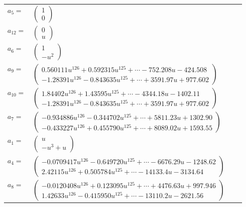 \documentclass[1p]{elsarticle_modified}
\theoremstyle{definition}
\begin{document}
\begin{tabular}{m{7pt} m{180pt} m{7pt} m{180pt} }
\flushright $a_{5}=$&$\begin{pmatrix}1\\0\end{pmatrix}$ \\
\flushright $a_{12}=$&$\begin{pmatrix}0\\u\end{pmatrix}$ \\
\flushright $a_{6}=$&$\begin{pmatrix}1\\- u^2\end{pmatrix}$ \\
\flushright $a_{9}=$&$\begin{pmatrix}0.560111 u^{126}+0.592315 u^{125}+\cdots-752.208 u-424.508\\-1.28391 u^{126}-0.843635 u^{125}+\cdots+3591.97 u+977.602\end{pmatrix}$ \\
\flushright $a_{10}=$&$\begin{pmatrix}1.84402 u^{126}+1.43595 u^{125}+\cdots-4344.18 u-1402.11\\-1.28391 u^{126}-0.843635 u^{125}+\cdots+3591.97 u+977.602\end{pmatrix}$ \\
\flushright $a_{7}=$&$\begin{pmatrix}-0.934886 u^{126}-0.344702 u^{125}+\cdots+5811.23 u+1302.90\\-0.433227 u^{126}+0.455790 u^{125}+\cdots+8089.02 u+1593.55\end{pmatrix}$ \\
\flushright $a_{1}=$&$\begin{pmatrix}u\\- u^3+u\end{pmatrix}$ \\
\flushright $a_{4}=$&$\begin{pmatrix}-0.0709417 u^{126}-0.649720 u^{125}+\cdots-6676.29 u-1248.62\\2.42115 u^{126}+0.505784 u^{125}+\cdots-14133.4 u-3134.64\end{pmatrix}$ \\
\flushright $a_{8}=$&$\begin{pmatrix}-0.0120408 u^{126}+0.123095 u^{125}+\cdots+4476.63 u+997.946\\1.42633 u^{126}-0.415950 u^{125}+\cdots-13110.2 u-2621.56\end{pmatrix}$ \\

\end{tabular}
\end{document}
